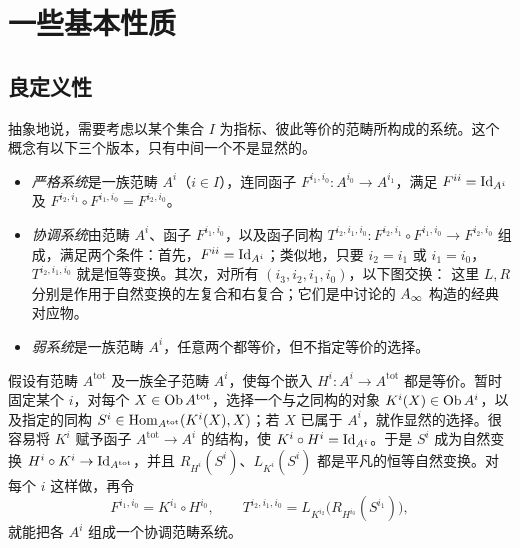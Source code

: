 \section{一些基本性质}\label{sec:10}
\subsection{良定义性}\label{sec:10a}
抽象地说，需要考虑以某个集合 $I$ 为指标、彼此等价的范畴所构成的系统。这个概念有以下三个版本，只有中间一个不是显然的。
\begin{definition*}
\begin{itemize}
\item \emph{严格系统}是一族范畴 $A^i$（$i\in I$），连同函子 $F^{i_1,i_0}:A^{i_0}\to A^{i_1}$，满足 $F^{ii}=\operatorname{Id}_{A^i}$ 及 $F^{i_2,i_1}\circ F^{i_1,i_0}=F^{i_2,i_0}$。
\item \emph{协调系统}由范畴 $A^i$、函子 $F^{i_1,i_0}$，以及函子同构 $T^{i_2,i_1,i_0}:F^{i_2,i_1}\circ F^{i_1,i_0}\to F^{i_2,i_0}$ 组成，满足两个条件：首先，$F^{ii}=\operatorname{Id}_{A^i}$；类似地，只要 $i_2=i_1$ 或 $i_1=i_0$，$T^{i_2,i_1,i_0}$ 就是恒等变换。其次，对所有 $(i_3,i_2,i_1,i_0)$，以下图交换：
这里 $L,R$ 分别是作用于自然变换的左复合和右复合；它们是中讨论的 $A_\infty$ 构造的经典对应物。
\item \emph{弱系统}是一族范畴 $A^i$，任意两个都等价，但不指定等价的选择。
\end{itemize}

\end{definition*}
假设有范畴 $A^{\mathrm{tot}}$ 及一族全子范畴 $A^i$，使每个嵌入 $H^i:A^i\to A^{\mathrm{tot}}$ 都是等价。暂时固定某个 $i$，对每个
$X\in\operatorname{Ob} A^{\mathrm{tot}}$，选择一个与之同构的对象 $K^i(X)\in\operatorname{Ob} A^i$，以及指定的同构 $S^i\in\operatorname{Hom}_{A^{\mathrm{tot}}}(K^i(X),X)$；若 $X$ 已属于 $A^i$，就作显然的选择。很容易将 $K^i$ 赋予函子 $A^{\mathrm{tot}}\to A^i$ 的结构，使 $K^i\circ H^i=\operatorname{Id}_{A^i}$。于是 $S^i$ 成为自然变换 $H^i\circ K^i\to\operatorname{Id}_{A^{\mathrm{tot}}}$，并且 $R_{H^i}(S^i)$、$L_{K^i}(S^i)$ 都是平凡的恒等自然变换。对每个 $i$ 这样做，再令
\[
F^{i_1,i_0}=K^{i_1}\circ H^{i_0},\qquad
T^{i_2,i_1,i_0}=L_{K^{i_2}}\bigl(R_{H^{i_0}}(S^{i_1})\bigr),
\]
就能把各 $A^i$ 组成一个协调范畴系统。

